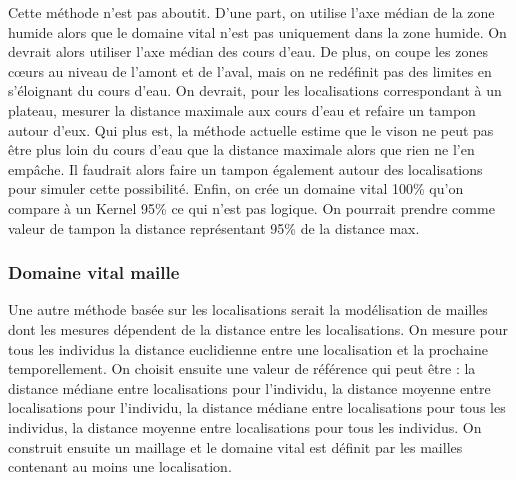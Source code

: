 \documentclass[
  letterpaper,
  DIV=11,
  numbers=noendperiod]{scrreprt}
\begin{document}
\begin{tcolorbox}[enhanced jigsaw, toptitle=1mm, title=\textcolor{quarto-callout-note-color}{\faInfo}\hspace{0.5em}{Révision de la méthode}, colback=white, toprule=.15mm, titlerule=0mm, rightrule=.15mm, arc=.35mm, breakable, colbacktitle=quarto-callout-note-color!10!white, left=2mm, opacityback=0, leftrule=.75mm, coltitle=black, colframe=quarto-callout-note-color-frame, opacitybacktitle=0.6, bottomtitle=1mm, bottomrule=.15mm]

Cette méthode n'est pas aboutit. D'une part, on utilise l'axe médian de
la zone humide alors que le domaine vital n'est pas uniquement dans la
zone humide. On devrait alors utiliser l'axe médian des cours d'eau. De
plus, on coupe les zones cœurs au niveau de l'amont et de l'aval, mais
on ne redéfinit pas des limites en s'éloignant du cours d'eau. On
devrait, pour les localisations correspondant à un plateau, mesurer la
distance maximale aux cours d'eau et refaire un tampon autour d'eux. Qui
plus est, la méthode actuelle estime que le vison ne peut pas être plus
loin du cours d'eau que la distance maximale alors que rien ne l'en
empâche. Il faudrait alors faire un tampon également autour des
localisations pour simuler cette possibilité. Enfin, on crée un domaine
vital 100\% qu'on compare à un Kernel 95\% ce qui n'est pas logique. On
pourrait prendre comme valeur de tampon la distance représentant 95\% de
la distance max.

\end{tcolorbox}

\subsubsection{Domaine vital maille}\label{domaine-vital-maille}

Une autre méthode basée sur les localisations serait la modélisation de
mailles dont les mesures dépendent de la distance entre les
localisations. On mesure pour tous les individus la distance euclidienne
entre une localisation et la prochaine temporellement. On choisit
ensuite une valeur de référence qui peut être : la distance médiane
entre localisations pour l'individu, la distance moyenne entre
localisations pour l'individu, la distance médiane entre localisations
pour tous les individus, la distance moyenne entre localisations pour
tous les individus. On construit ensuite un maillage et le domaine vital
est définit par les mailles contenant au moins une localisation.
\end{document}
